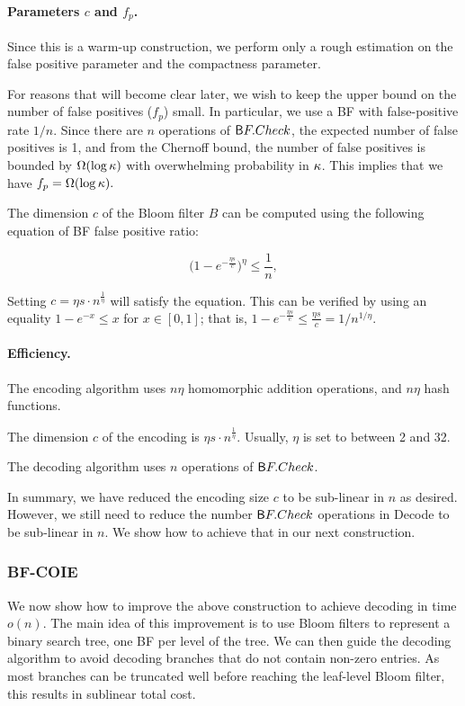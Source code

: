 \paragraph{Parameters $c$ and $f_p$.} Since this is a warm-up
construction, we perform only a rough estimation on the false positive parameter
and the compactness parameter. 

For reasons that will become clear later, we wish to keep the upper bound
on the number of false positives ($f_p$) small.  In
particular, we use a BF with false-positive rate $1/n$. Since there
are $n$ operations of $\sf BF.Check$, the expected number of false
positives is 1, and from the Chernoff bound, the number of false
positives is bounded by $\Omega(\log \secparam)$ with overwhelming
probability in $\secparam$. This implies that we have $f_p = \Omega(\log
\secparam).$

The dimension $c$ of the Bloom filter $B$ can be
computed using the following equation of BF false positive ratio: 

$$ \Big(1 - e^{-\frac{\eta s}{c}} \Big)^\eta \le \frac 1 n,$$ 

Setting $c = \eta s \cdot n^{\frac 1 \eta}$ will satisfy the
equation. This can be verified by using an equality $1 - e^{-x} \le x$
for $x \in [0,1]$; that is, $1 - e^{-\frac{\eta s}{c}} \le \frac{\eta
s}{c} = 1/n^{1/\eta}.$

\paragraph{Efficiency.}
\BI
\item The encoding algorithm uses $n\eta$ homomorphic addition
operations, and $n\eta$ hash functions.  

\item The dimension $c$ of the encoding is $\eta s \cdot n^{\frac 1
\eta}$. Usually, $\eta$ is set to between 2 and 32.

\item The decoding algorithm uses $n$ operations of $\sf BF.Check$.
\EI

In summary, we have reduced the encoding size $c$ to be sub-linear in $n$ as desired. However, we still need to reduce the number $\sf
BF.Check$ operations in Decode to be sub-linear in $n$. We show how to achieve that in our next construction.

\subsubsection{BF-COIE}\label{sec:BF-COIE}
We now show how to improve the above construction to achieve decoding in
time $o(n)$.  The main idea of this improvement is to use Bloom filters
to represent a binary search tree, one BF per level of the tree.  We can
then guide the decoding algorithm to avoid decoding branches that do not contain
non-zero entries.  As most branches can be truncated well before
reaching the leaf-level Bloom filter, this results in sublinear total
cost.

